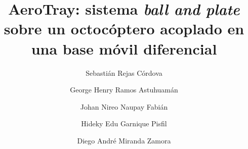\begin{frontmatter}

\title{AeroTray: sistema \textit{ball and plate} sobre un octocóptero acoplado en una base móvil diferencial}

\author[utec]{Sebastián Rejas Córdova}
\author[utec]{George Henry Ramos Astuhuamán}
\author[utec]{Johan Nireo Naupay Fabián}
\author[utec]{Hideky Edu Garnique Pisfil}
\author[utec]{Diego André Miranda Zamora}
\address[utec]{Departamento de Ingeniería Mecatrónica, Universidad de Ingeniería y Tecnología (UTEC), Jr. Medrano Silva 165, Barranco, Lima, Perú}


\end{frontmatter}
